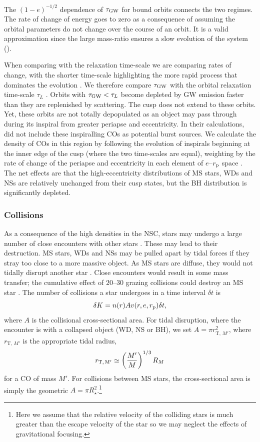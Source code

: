 The $(1-e)^{-1/2}$ dependence of $\tau_\mathrm{GW}$ for bound orbits connects the two regimes. The rate of change of energy goes to zero as a consequence of assuming the orbital parameters do not change over the course of an orbit. It is a valid approximation since the large mass-ratio ensures a slow evolution of the system ().

When comparing with the relaxation time-scale we are comparing rates of change, with the shorter time-scale highlighting the more rapid process that dominates the evolution \citep{Amaro-Seoane2007}. We therefore compare $\tau_\mathrm{GW}$ with the orbital relaxation time-scale $\tau_L$ \citep{Merritt2011}. Orbits with $\tau_\mathrm{GW} < \tau_L$ become depleted by GW emission faster than they are replenished by scattering. The cusp does not extend to these orbits. Yet, these orbits are not totally depopulated as an object may pass through during its inspiral from greater periapse and eccentricity. In their calculations, \citet{Hopman2007} did not include these inspiralling COs as potential burst sources. We calculate the density of COs in this region by following the evolution of inspirals beginning at the inner edge of the cusp (where the two time-scales are equal), weighting by the rate of change of the periapse and eccentricity in each element of $e$--$r_\mathrm{p}$ space \citep{Peters1964}. The net effects are that the high-eccentricity distributions of MS stars, WDs and NSs are relatively unchanged from their cusp states, but the BH distribution is significantly depleted.

\subsubsection{Collisions}\label{sec:Collision}

As a consequence of the high densities in the NSC, stars may undergo a large number of close encounters with other stars \citep{Cohn1978}. These may lead to their destruction. MS stars, WDs and NSs may be pulled apart by tidal forces if they stray too close to a more massive object. As MS stars are diffuse, they would not tidally disrupt another star \citep{Murphy1991,Freitag2005}. Close encounters would result in some mass transfer; the cumulative effect of $20$--$30$ grazing collisions could destroy an MS star \citep{Freitag2006}. The number of collisions a star undergoes in a time interval $\delta t$ is
\begin{equation}
\delta K = n(r) A v(r,e,r_\mathrm{p})\delta t,
\end{equation}
where $A$ is the collisional cross-sectional area. For tidal disruption, where the encounter is with a collapsed object (WD, NS or BH), we set $A = \pi r_{\mathrm{T},\,{M'}}^2$, where $r_{\mathrm{T},\,{M'}}$ is the appropriate tidal radius,
\begin{equation}
r_\mathrm{T,\,{M'}} \simeq \left(\dfrac{M'}{M}\right)^{1/3}R_M
\end{equation}
for a CO of mass $M'$. For collisions between MS stars, the cross-sectional area is simply the geometric $A = \pi R_\star^2$.\footnote{Here we assume that the relative velocity of the colliding stars is much greater than the escape velocity of the star so we may neglect the effects of gravitational focusing.}

